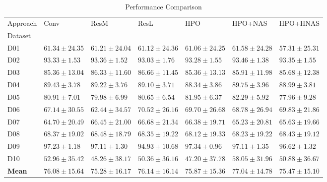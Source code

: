 \begin{table}
\caption{Performance Comparison}
\label{tab:results}
\begin{tabular}{lllllll}
\toprule
Approach & Conv & ResM & ResL & HPO & HPO+NAS & HPO+HNAS \\
Dataset &  &  &  &  &  &  \\
\midrule
D01 & $61.34 \pm 24.35$ & $61.21 \pm 24.04$ & $61.12 \pm 24.36$ & $61.06 \pm 24.25$ & $\mathbf{61.58 \pm 24.28}$ & $57.31 \pm 25.31$ \\
D02 & $93.33 \pm 1.53$ & $93.36 \pm 1.52$ & $93.03 \pm 1.76$ & $93.28 \pm 1.55$ & $\mathbf{93.46 \pm 1.38}$ & $93.35 \pm 1.55$ \\
D03 & $85.36 \pm 13.04$ & $86.33 \pm 11.60$ & $\mathbf{86.66 \pm 11.45}$ & $85.36 \pm 13.13$ & $85.91 \pm 11.98$ & $85.68 \pm 12.38$ \\
D04 & $89.43 \pm 3.78$ & $89.22 \pm 3.76$ & $89.10 \pm 3.71$ & $88.34 \pm 3.86$ & $\mathbf{89.75 \pm 3.96}$ & $88.99 \pm 3.81$ \\
D05 & $80.91 \pm 7.01$ & $79.98 \pm 6.99$ & $80.65 \pm 6.54$ & $81.95 \pm 6.37$ & $\mathbf{82.29 \pm 5.92}$ & $77.96 \pm 9.28$ \\
D06 & $67.14 \pm 30.55$ & $62.44 \pm 34.57$ & $\mathbf{70.52 \pm 26.16}$ & $69.70 \pm 26.68$ & $68.78 \pm 26.94$ & $69.83 \pm 21.86$ \\
D07 & $64.70 \pm 20.49$ & $66.45 \pm 21.00$ & $\mathbf{66.68 \pm 21.34}$ & $66.38 \pm 19.71$ & $65.23 \pm 20.81$ & $65.63 \pm 19.66$ \\
D08 & $68.37 \pm 19.02$ & $\mathbf{68.48 \pm 18.79}$ & $68.35 \pm 19.22$ & $68.12 \pm 19.33$ & $68.23 \pm 19.22$ & $68.43 \pm 19.12$ \\
D09 & $97.23 \pm 1.18$ & $97.11 \pm 1.30$ & $94.93 \pm 10.68$ & $\mathbf{97.34 \pm 0.96}$ & $97.11 \pm 1.35$ & $96.62 \pm 1.32$ \\
D10 & $52.96 \pm 35.42$ & $48.26 \pm 38.17$ & $50.36 \pm 36.16$ & $47.20 \pm 37.78$ & $\mathbf{58.05 \pm 31.96}$ & $50.88 \pm 36.67$ \\
\textbf{Mean} & $76.08 \pm 15.64$ & $75.28 \pm 16.17$ & $76.14 \pm 16.14$ & $75.87 \pm 15.36$ & $\mathbf{77.04 \pm 14.78}$ & $75.47 \pm 15.10$ \\
\bottomrule
\end{tabular}
\end{table}
